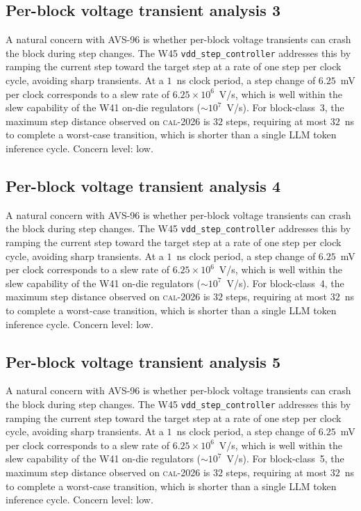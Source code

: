 \subsection{Per-block voltage transient analysis 3}

A natural concern with AVS-96 is whether per-block voltage transients
can crash the block during step changes. The W45 \texttt{vdd\_step\_controller} addresses this by ramping the current
step toward the target step at a rate of one step per clock cycle,
avoiding sharp transients. At a $1$~ns clock period, a step change of
$6.25$~mV per clock corresponds to a slew rate of $6.25\times 10^6$~V/s,
which is well within the slew capability of the W41 on-die regulators
($\sim 10^7$~V/s). For block-class~3, the maximum step distance
observed on \textsc{cal-2026} is $32$ steps, requiring at most $32$~ns
to complete a worst-case transition, which is shorter than a single
LLM token inference cycle. Concern level: low.


\subsection{Per-block voltage transient analysis 4}

A natural concern with AVS-96 is whether per-block voltage transients
can crash the block during step changes. The W45 \texttt{vdd\_step\_controller} addresses this by ramping the current
step toward the target step at a rate of one step per clock cycle,
avoiding sharp transients. At a $1$~ns clock period, a step change of
$6.25$~mV per clock corresponds to a slew rate of $6.25\times 10^6$~V/s,
which is well within the slew capability of the W41 on-die regulators
($\sim 10^7$~V/s). For block-class~4, the maximum step distance
observed on \textsc{cal-2026} is $32$ steps, requiring at most $32$~ns
to complete a worst-case transition, which is shorter than a single
LLM token inference cycle. Concern level: low.


\subsection{Per-block voltage transient analysis 5}

A natural concern with AVS-96 is whether per-block voltage transients
can crash the block during step changes. The W45 \texttt{vdd\_step\_controller} addresses this by ramping the current
step toward the target step at a rate of one step per clock cycle,
avoiding sharp transients. At a $1$~ns clock period, a step change of
$6.25$~mV per clock corresponds to a slew rate of $6.25\times 10^6$~V/s,
which is well within the slew capability of the W41 on-die regulators
($\sim 10^7$~V/s). For block-class~5, the maximum step distance
observed on \textsc{cal-2026} is $32$ steps, requiring at most $32$~ns
to complete a worst-case transition, which is shorter than a single
LLM token inference cycle. Concern level: low.


